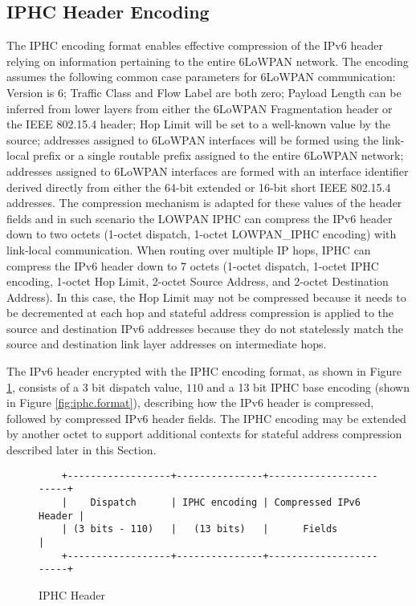 \documentclass[12pt, titlepage, a4paper]{report}
\newenvironment{mylisting}
{\begin{list}{}{\setlength{\leftmargin}{1em}}\item\footnotesize}
{\end{list}}
\begin{document}
\subsection{IPHC Header Encoding}
The IPHC encoding format enables effective compression of the IPv6 header relying on information pertaining to the entire 6LoWPAN network. The encoding assumes the following common case parameters for 6LoWPAN communication: Version is $6$; Traffic Class and Flow Label are both zero; Payload Length can be inferred from lower layers from either the 6LoWPAN Fragmentation header or the IEEE 802.15.4 header; Hop Limit will be set to a well-known value by the source; addresses assigned to 6LoWPAN interfaces will be formed using the link-local prefix or a single routable prefix assigned to the entire 6LoWPAN network; addresses assigned to 6LoWPAN interfaces are formed with an interface identifier derived directly from either the 64-bit extended or 16-bit short IEEE 802.15.4 addresses. The compression mechanism is adapted for these values of the header fields and in such scenario the LOWPAN IPHC can compress the IPv6 header down to two octets (1-octet dispatch, 1-octet LOWPAN\_IPHC encoding) with link-local communication.  When routing over multiple IP hops, IPHC can compress the IPv6 header down to 7 octets (1-octet dispatch, 1-octet IPHC encoding, 1-octet Hop Limit, 2-octet Source Address, and 2-octet Destination Address).  In this case, the Hop Limit may not be compressed because it needs to be decremented at each hop and stateful address compression is applied to the source and destination IPv6 addresses because they do not statelessly match the source and destination link layer addresses on intermediate hops.

The IPv6 header encrypted with the IPHC encoding format, as shown in Figure \ref{fig:iphc.header}, consists of a 3 bit dispatch value, $110$ and a 13 bit IPHC base encoding (shown in Figure \ref{fig:iphc.format}), describing how the IPv6 header is compressed, followed by compressed IPv6 header fields. The IPHC encoding may be extended by another octet to support additional contexts for stateful address compression described later in this Section.

\begin{figure}[htp]
\begin{mylisting}
\begin{verbatim}
    +------------------+---------------+------------------------+
    |    Dispatch      | IPHC encoding | Compressed IPv6 Header |
    | (3 bits - 110)   |   (13 bits)   |      Fields            |
    +------------------+---------------+------------------------+
\end{verbatim}
\end{mylisting}
\caption{IPHC Header}\label{fig:iphc.header}
\end{figure}
\end{document}
